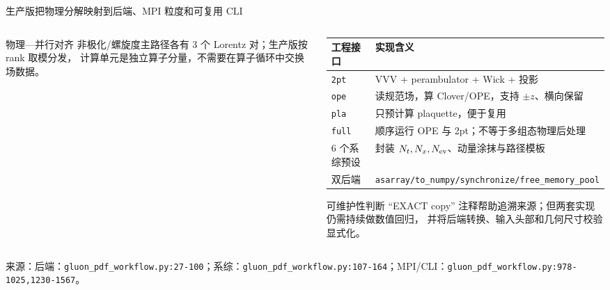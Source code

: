 \documentclass[UTF8,aspectratio=169,11pt]{ctexbeamer}
\newcommand{\source}[1]{%
  \vspace{0.06em}\par{\raggedright\scriptsize\color{muted}来源：#1\par}}
\newcommand{\codepath}[1]{\nolinkurl{#1}}
\begin{document}
\begin{frame}[t]{生产版把物理分解映射到后端、MPI 粒度和可复用 CLI}
  \begin{columns}[T,totalwidth=\textwidth]
    \begin{column}{0.48\textwidth}
      \small
      \begin{block}{物理—并行对齐}
        非极化/螺旋度主路径各有 3 个 Lorentz 对；生产版按 rank 取模分发，
        计算单元是独立算子分量，不需要在算子循环中交换场数据。
      \end{block}
    \end{column}
    \begin{column}{0.48\textwidth}
      \scriptsize
      \begin{tabularx}{\linewidth}{@{}lY@{}}
        \toprule
        工程接口 & 实现含义 \\
        \midrule
        \codepath{2pt} & VVV + perambulator + Wick + 投影 \\
        \codepath{ope} & 读规范场，算 Clover/OPE，支持 \(\pm z\)、横向保留 \\
        \codepath{pla} & 只预计算 plaquette，便于复用 \\
        \codepath{full} & 顺序运行 OPE 与 2pt；不等于多组态物理后处理 \\
        6 个系综预设 & 封装 \(N_t,N_x,N_{\rm ev}\)、动量涂抹与路径模板 \\
        双后端 & \codepath{asarray/to_numpy/synchronize/free_memory_pool} \\
        \bottomrule
      \end{tabularx}
      \begin{block}{可维护性判断}
        “EXACT copy” 注释帮助追溯来源；但两套实现仍需持续做数值回归，
        并将后端转换、输入头部和几何尺寸校验显式化。
      \end{block}
    \end{column}
  \end{columns}
  \source{后端：\codepath{gluon_pdf_workflow.py:27-100}；系综：\codepath{gluon_pdf_workflow.py:107-164}；MPI/CLI：\codepath{gluon_pdf_workflow.py:978-1025,1230-1567}。}
\end{frame}
\end{document}
